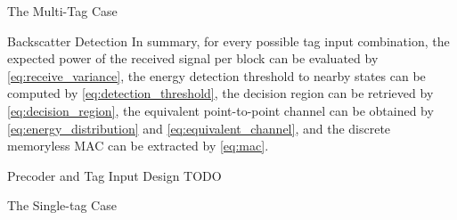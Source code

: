 \documentclass[journal]{IEEEtran}
\begin{document}
\begin{section}{The Multi-Tag Case}
\begin{subsection}{Backscatter Detection}
			In summary, for every possible tag input combination, the expected power of the received signal per block can be evaluated by \eqref{eq:receive_variance}, the energy detection threshold to nearby states can be computed by \eqref{eq:detection_threshold}, the decision region can be retrieved by \eqref{eq:decision_region}, the equivalent point-to-point channel can be obtained by \eqref{eq:energy_distribution} and \eqref{eq:equivalent_channel}, and the discrete memoryless MAC can be extracted by \eqref{eq:mac}.
		\end{subsection}
	\end{section}

	\begin{section}{Precoder and Tag Input Design}
		TODO
	\end{section}

	\begin{section}{The Single-tag Case}

\end{section}
\end{document}
